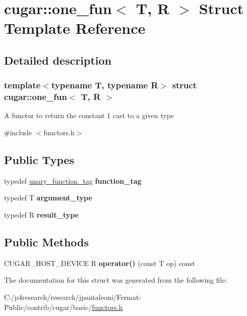 \hypertarget{structcugar_1_1one__fun}{}\section{cugar\+:\+:one\+\_\+fun$<$ T, R $>$ Struct Template Reference}
\label{structcugar_1_1one__fun}


\subsection{Detailed description}
\subsubsection*{template$<$typename T, typename R$>$\newline
struct cugar\+::one\+\_\+fun$<$ T, R $>$}

A functor to return the constant 1 cast to a given type 

{\ttfamily \#include $<$functors.\+h$>$}

\subsection*{Public Types}
\begin{DoxyCompactItemize}
\item 
\mbox{\label{structcugar_1_1one__fun_af6ece46bd3a4df70c6b24208bf297979}} 
typedef \hyperlink{structcugar_1_1unary__function__tag}{unary\+\_\+function\+\_\+tag} {\bfseries function\+\_\+tag}
\item 
\mbox{\label{structcugar_1_1one__fun_a8dc24bab1eb3accad65a48ee39b6446a}} 
typedef T {\bfseries argument\+\_\+type}
\item 
\mbox{\label{structcugar_1_1one__fun_a9e6cf2a01024df6d5bbf9b164d985ae8}} 
typedef R {\bfseries result\+\_\+type}
\end{DoxyCompactItemize}
\subsection*{Public Methods}
\begin{DoxyCompactItemize}
\item 
\mbox{\label{structcugar_1_1one__fun_ac6047c977e5eb1a641b63041ae0d4b70}} 
C\+U\+G\+A\+R\+\_\+\+H\+O\+S\+T\+\_\+\+D\+E\+V\+I\+CE R {\bfseries operator()} (const T op) const
\end{DoxyCompactItemize}


The documentation for this struct was generated from the following file\+:\begin{DoxyCompactItemize}
\item 
C\+:/p4research/research/jpantaleoni/\+Fermat-\/\+Public/contrib/cugar/basic/\hyperlink{functors_8h}{functors.\+h}\end{DoxyCompactItemize}
